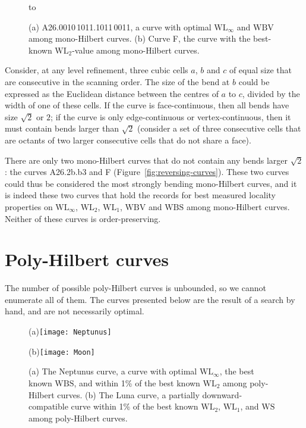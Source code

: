 \documentclass[11pt,a4paper]{article}
\def\WLMax{\ensuremath{\mathrm{WL}_\infty}\xspace}
\def\WLEuc{\ensuremath{\mathrm{WL}_2}\xspace}
\def\WLMan{\ensuremath{\mathrm{WL}_1}\xspace}
\def\WS{\ensuremath{\mathrm{WS}}\xspace}
\def\WBV{\ensuremath{\mathrm{WBV}}\xspace}
\def\WBS{\ensuremath{\mathrm{WBS}}\xspace}
\begin{document}
\begin{figure}
\centering
\hbox to \hsize{\hfill
\texttt{[image: A26-2b-b3]}\hfill
\texttt{[image: F]}\hfill
}
\caption{(a) A26.0010\,1011.1011\,0011, a curve with optimal \WLMax and \WBV among mono-Hilbert curves.
(b) Curve F, the curve with the best-known \WLEuc-value among mono-Hilbert curves.}
\label{fig:reversing-curves}\label{fig:A26.2b.b3}
\end{figure}

Consider, at any level refinement, three cubic cells $a$, $b$ and $c$ of equal size that are consecutive in the scanning order. The size of the bend at $b$ could be expressed as the Euclidean distance between the centres of $a$ to $c$, divided by the width of one of these cells. If the curve is face-continuous, then all bends have size $\sqrt{2}$ or $2$; if the curve is only edge-continuous or vertex-continuous, then it must contain bends larger than $\sqrt{2}$ (consider a set of three consecutive cells that are octants of two larger consecutive cells that do not share a face).


There are only two mono-Hilbert curves that do not contain any bends larger $\sqrt{2}$: the curves A26.2b.b3 and F (Figure~\ref{fig:reversing-curves}). These two curves could thus be considered the most strongly bending mono-Hilbert curves, and it is indeed these two curves that hold the records for best measured locality properties on \WLMax, \WLEuc, \WLMan, \WBV and \WBS among mono-Hilbert curves. Neither of these curves is order-preserving.


\section{Poly-Hilbert curves}

The number of possible poly-Hilbert curves is unbounded, so we cannot enumerate all of them. The curves presented below are the result of a search by hand, and are not necessarily optimal.

\begin{figure}
\centering
(a)\texttt{[image: Neptunus]}

(b)\texttt{[image: Moon]}
\caption{(a) The Neptunus curve, a curve with optimal \WLMax, the best known \WBS, and within 1\% of the best known \WLEuc among poly-Hilbert curves.
(b) The Luna curve, a partially downward-compatible curve within 1\% of the best known \WLEuc, \WLMan, and \WS among poly-Hilbert curves.}
\label{fig:di-curves}
\end{figure}
\end{document}
